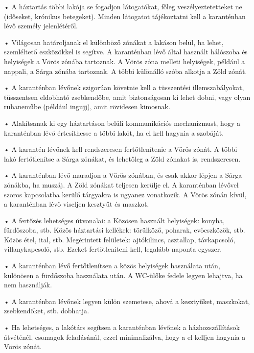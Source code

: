 \documentclass[twocolumn,journal]{IEEEtran}
\begin{document}
• A háztartás többi lakója se fogadjon látogatókat, főleg veszélyeztetetteket ne (időseket, krónikus betegeket). Minden látogatot tájékoztatni kell a karanténban lévő személy jelenlétéről.

• Világosan határoljanak el különböző zónákat a lakáson belül, ha lehet, szemléltető eszközökkel is segítve. A karanténban lévő által használt hálószoba és helyiségek a Vörös zónába tartoznak. A Vörös zóna melleti helyiségek, például a nappali, a Sárga zónába tartoznak. A többi különálló szóba alkotja a Zöld zónát. 

• A karanténban lévőnek szigorúan követnie kell a tüsszentési illemszabályokat, tüsszentsen eldobható zsebkendőbe, amit biztonságosan ki lehet dobni, vagy olyan ruhaneműbe (például ingujj), amit rövidesen kimosnak. 

• Alakítsanak ki egy háztartáson belüli kommunikációs mechanizmust, hogy a karanténban lévő értesíthesse a többi lakót, ha el kell hagynia a szobáját.

• A karantén lévőnek kell rendszeresen fertőtlenítenie a Vörös zónát. A többi lakó fertőtlenítse a Sárga zónákat, és lehetőleg a Zöld zónakat is, rendszeresen.

• A karanténban lévő maradjon a Vörös zónában, és csak akkor lépjen a Sárga zónákba, ha muszáj. A Zöld zónákat teljesen kerülje el. A karanténban lévővel szoros kapcsolatba kerülő tárgyakra is ugyanez vonatkozik. A Vörös zónán kívül, a karanténban lévő viseljen kesztyűt és maszkot.

• A fertőzés lehetséges útvonalai: a Közösen használt helyiségek: konyha, fürdőszoba, stb. Közös háztartási kellékek: törülköző, poharak, evőeszközök, stb. Közös étel, ital, stb. Megérintett felületek: ajtókilincs, asztallap, távkapcsoló, villanykapcsoló, stb. Ezeket fertőtleníteni kell, legalább naponta egyszer.

• A karanténban lévő fertőtlenítsen a közös helyiségek használata után, különösen a fürdőszoba használata után. A WC-ülőke fedele legyen lehajtva, ha nem használják.

• A karanténban lévőnek legyen külön szemetese, ahová a kesztyűket, maszkokat, zsebkendőket, stb. dobhatja.

• Ha lehetséges, a lakótárs segítsen a karanténban lévőnek a házhozszállítások átvéténél, csomagok feladásánál, ezzel minimalizálva, hogy a el kelljen hagynia a Vörös zónát.
\end{document}
